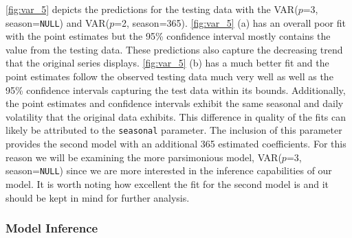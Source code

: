 \documentclass{article}\usepackage[]{graphicx}\usepackage[]{color}
\begin{document}
\autoref{fig:var_5} depicts the predictions for the testing data with the VAR($p$=3, season=\texttt{NULL}) and VAR($p$=2, season=365). \autoref{fig:var_5} (a) has an overall poor fit with the point estimates but the 95\% confidence interval mostly contains the value from the testing data. These predictions also capture the decreasing trend that the original series displays. \autoref{fig:var_5} (b) has a much better fit and the point estimates follow the observed testing data much very well as well as the 95\% confidence intervals capturing the test data within its bounds. Additionally, the point estimates and confidence intervals exhibit the same seasonal and daily volatility that the original data exhibits. This difference in quality of the fits can likely be attributed to the \texttt{seasonal} parameter. The inclusion of this parameter provides the second model with an additional 365 estimated coefficients. For this reason we will be examining the more parsimonious model, VAR($p$=3, season=\texttt{NULL}) since we are more interested in the inference capabilities of our model. It is worth noting how excellent the fit for the second model is and it should be kept in mind for further analysis. 

\subsubsection*{Model Inference}
\end{document}

